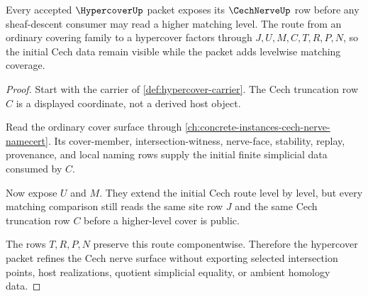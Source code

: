\begin{theorem}
\label{thm:hypercover-cech-nerve-route}
Every accepted $\HypercoverUp$ packet exposes its $\CechNerveUp$ row before any sheaf-descent consumer may read a higher matching level. The route from an ordinary covering family to a hypercover factors through $J,U,M,C,T,R,P,N$, so the initial Cech data remain visible while the packet adds levelwise matching coverage.
\end{theorem}
\begin{proof}
Start with the carrier of \autoref{def:hypercover-carrier}. The Cech truncation row $C$ is a displayed coordinate, not a derived host object.

Read the ordinary cover surface through \autoref{ch:concrete-instances-cech-nerve-namecert}. Its cover-member, intersection-witness, nerve-face, stability, replay, provenance, and local naming rows supply the initial finite simplicial data consumed by $C$.

Now expose $U$ and $M$. They extend the initial Cech route level by level, but every matching comparison still reads the same site row $J$ and the same Cech truncation row $C$ before a higher-level cover is public.

The rows $T,R,P,N$ preserve this route componentwise. Therefore the hypercover packet refines the Cech nerve surface without exporting selected intersection points, host realizations, quotient simplicial equality, or ambient homology data.
\end{proof}

